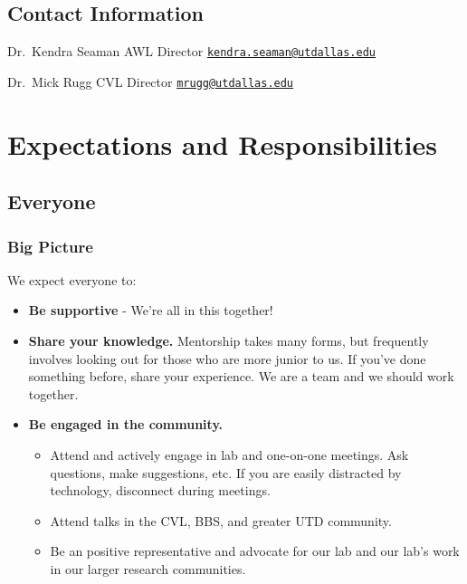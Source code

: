 \documentclass[]{book}
\providecommand{\tightlist}{%
  \setlength{\itemsep}{0pt}\setlength{\parskip}{0pt}}
\begin{document}
\hypertarget{contact-information}{%
\section{Contact Information}\label{contact-information}}

Dr.~Kendra Seaman
AWL Director
\href{mailto:kendra.seaman@utdallas.edu}{\nolinkurl{kendra.seaman@utdallas.edu}}

Dr.~Mick Rugg
CVL Director
\href{mailto:mrugg@utdallas.edu}{\nolinkurl{mrugg@utdallas.edu}}

\hypertarget{expectations-and-responsibilities}{%
\chapter{Expectations and Responsibilities}\label{expectations-and-responsibilities}}

\hypertarget{everyone}{%
\section{Everyone}\label{everyone}}

\hypertarget{big-picture}{%
\subsection{Big Picture}\label{big-picture}}

We expect everyone to:

\begin{itemize}
\tightlist
\item
  \textbf{Be supportive} - We're all in this together!\\
\item
  \textbf{Share your knowledge.} Mentorship takes many forms, but frequently involves looking out for those who are more junior to us. If you've done something before, share your experience. We are a team and we should work together.
\item
  \textbf{Be engaged in the community.}

  \begin{itemize}
  \tightlist
  \item
    Attend and actively engage in lab and one-on-one meetings. Ask questions, make suggestions, etc. If you are easily distracted by technology, disconnect during meetings.\\
  \item
    Attend talks in the CVL, BBS, and greater UTD community.\\
  \item
    Be an positive representative and advocate for our lab and our lab's work in our larger research communities.
  \end{itemize}
\end{itemize}
\end{document}
